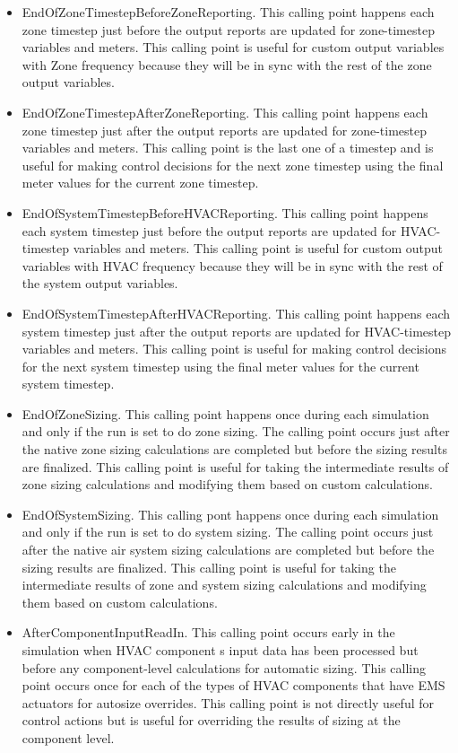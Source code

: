 \begin{itemize}
\item
  EndOfZoneTimestepBeforeZoneReporting. This calling point happens each zone timestep just before the output reports are updated for zone-timestep variables and meters. This calling point is useful for custom output variables with Zone frequency because they will be in sync with the rest of the zone output variables.
\item
  EndOfZoneTimestepAfterZoneReporting. This calling point happens each zone timestep just after the output reports are updated for zone-timestep variables and meters. This calling point is the last one of a timestep and is useful for making control decisions for the next zone timestep using the final meter values for the current zone timestep.
\item
  EndOfSystemTimestepBeforeHVACReporting. This calling point happens each system timestep just before the output reports are updated for HVAC-timestep variables and meters. This calling point is useful for custom output variables with HVAC frequency because they will be in sync with the rest of the system output variables.
\item
  EndOfSystemTimestepAfterHVACReporting. This calling point happens each system timestep just after the output reports are updated for HVAC-timestep variables and meters. This calling point is useful for making control decisions for the next system timestep using the final meter values for the current system timestep.
\item
  EndOfZoneSizing. This calling point happens once during each simulation and only if the run is set to do zone sizing. The calling point occurs just after the native zone sizing calculations are completed but before the sizing results are finalized. This calling point is useful for taking the intermediate results of zone sizing calculations and modifying them based on custom calculations.
\item
  EndOfSystemSizing. This calling pont happens once during each simulation and only if the run is set to do system sizing. The calling point occurs just after the native air system sizing calculations are completed but before the sizing results are finalized. This calling point is useful for taking the intermediate results of zone and system sizing calculations and modifying them based on custom calculations.
\item
  AfterComponentInputReadIn. This calling point occurs early in the simulation when HVAC component s input data has been processed but before any component-level calculations for automatic sizing. This calling point occurs once for each of the types of HVAC components that have EMS actuators for autosize overrides. This calling point is not directly useful for control actions but is useful for overriding the results of sizing at the component level.

\end{itemize}
